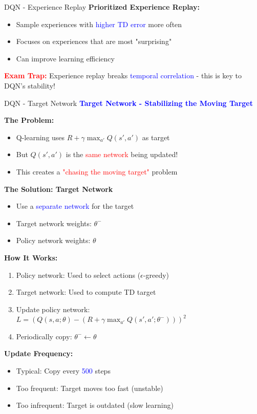 \documentclass[8pt]{beamer}
\begin{document}
\begin{frame}{DQN - Experience Replay}
		\textbf{Prioritized Experience Replay:}
		\begin{itemize}
			\item Sample experiences with \textcolor{blue}{higher TD error} more often
			\item Focuses on experiences that are most "surprising"
			\item Can improve learning efficiency
		\end{itemize}
		
		\textcolor{red}{\textbf{Exam Trap:}} Experience replay breaks \textcolor{blue}{temporal correlation} - this is key to DQN's stability!
	\end{frame}
	
	\begin{frame}{DQN - Target Network}
		\fontsize{6.5}{7.5}\selectfont
		\textcolor{blue}{\textbf{Target Network - Stabilizing the Moving Target}}
		
		\textbf{The Problem:}
		\begin{itemize}
			\item Q-learning uses $R + \gamma \max_{a'} Q(s',a')$ as target
			\item But $Q(s',a')$ is the \textcolor{red}{same network} being updated!
			\item This creates a \textcolor{red}{"chasing the moving target"} problem
		\end{itemize}
		
		\textbf{The Solution: Target Network}
		\begin{itemize}
			\item Use a \textcolor{blue}{separate network} for the target
			\item Target network weights: $\theta^-$
			\item Policy network weights: $\theta$
		\end{itemize}
		
		\textbf{How It Works:}
		\begin{enumerate}
			\item Policy network: Used to select actions ($\epsilon$-greedy)
			\item Target network: Used to compute TD target
			\item Update policy network: $L = (Q(s,a;\theta) - (R + \gamma \max_{a'} Q(s',a';\theta^-)))^2$
			\item Periodically copy: $\theta^- \leftarrow \theta$
		\end{enumerate}
		
		\textbf{Update Frequency:}
		\begin{itemize}
			\item Typical: Copy every \textcolor{blue}{500} steps
			\item Too frequent: Target moves too fast (unstable)
			\item Too infrequent: Target is outdated (slow learning)
		\end{itemize}
		

\end{frame}
\end{document}
